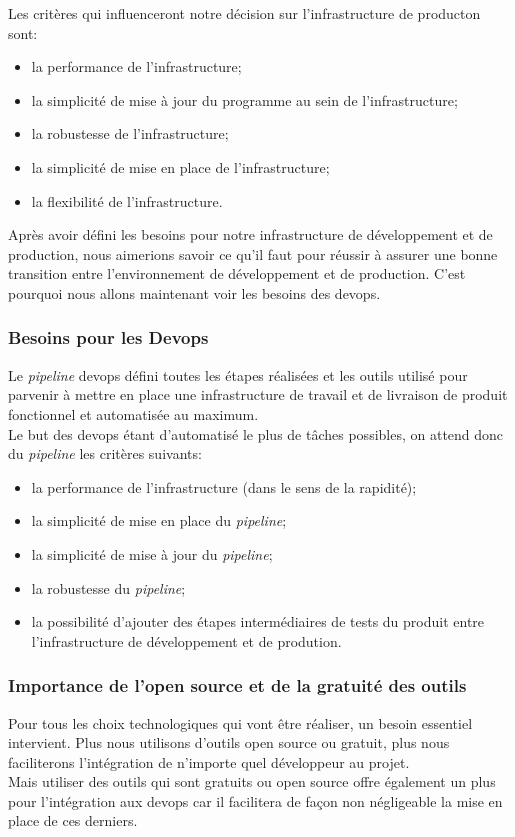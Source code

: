 \documentclass[
    iai, %
    il, %
]{heig-tb}
\begin{document}
Les critères qui influenceront notre décision sur l'infrastructure de producton sont:
\begin{itemize}
    \item la performance de l'infrastructure;
    \item la simplicité de mise à jour du programme au sein de l'infrastructure;
    \item la robustesse de l'infrastructure;
    \item la simplicité de mise en place de l'infrastructure;
    \item la flexibilité de l'infrastructure.
\end{itemize}

Après avoir défini les besoins pour notre infrastructure de développement et de production, nous aimerions savoir ce qu'il faut pour réussir à assurer une bonne transition entre l'environnement de développement et de production. C'est pourquoi nous allons maintenant voir les besoins des \Gls{devops}.

\subsubsection{Besoins pour les Devops}
Le \emph{pipeline} \Gls{devops} défini toutes les étapes réalisées et les outils utilisé pour parvenir à mettre en place une infrastructure de travail et de livraison de produit fonctionnel et automatisée au maximum.\\
Le but des \Gls{devops} étant d'automatisé le plus de tâches possibles, on attend donc du \emph{pipeline} les critères suivants:
\begin{itemize}
    \item la performance de l'infrastructure (dans le sens de la rapidité);
    \item la simplicité de mise en place du \emph{pipeline};
    \item la simplicité de mise à jour du \emph{pipeline};
    \item la robustesse du \emph{pipeline};
    \item la possibilité d'ajouter des étapes intermédiaires de tests du produit entre l'infrastructure de développement et de prodution.
\end{itemize}

\subsubsection{Importance de l'open source et de la gratuité des outils}
Pour tous les choix technologiques qui vont être réaliser, un besoin essentiel intervient.
Plus nous utilisons d'outils open source ou gratuit, plus nous faciliterons l'intégration de n'importe quel développeur au projet.\\
Mais utiliser des outils qui sont gratuits ou open source offre également un plus pour l'intégration aux \Gls{devops} car il facilitera de façon non négligeable la mise en place de ces derniers.
\end{document}
